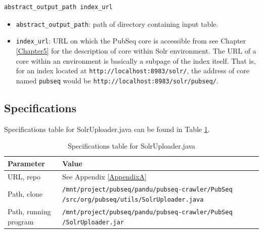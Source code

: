\begin{lstlisting}[breaklines]
abstract_output_path index_url
\end{lstlisting}

\begin{itemize}
\item \texttt{abstract\_output\_path}: path of directory containing input table.
\item \texttt{index\_url}: URL on which the PubSeq core is accessible from see Chapter \ref{Chapter5} for the description of core within Solr environment. The URL of a core within an environment is basically a subpage of the index itself. That is, for an index located at \texttt{http://localhost:8983/solr/}, the address of core named \texttt{pubseq} would be \texttt{http://localhost:8983/solr/pubseq/}.
\end{itemize}

\subsection{Specifications}

Specifications table for SolrUploader.java can be found in Table \ref{tab:SolrUploader}.

\begin{table}[htbp]
\caption{Specifications table for SolrUploader.java}
\centering
\begin{tabularx}{\textwidth}{ | l | X | }
  \hline
  Parameter & Value \\
  \hline
  URL, repo & See Appendix \ref{AppendixA} \\
  Path, clone & \texttt{/mnt/project/pubseq/pandu/pubseq-crawler/PubSeq /src/org/pubseq/utils/SolrUploader.java} \\
  Path, running program & \texttt{/mnt/project/pubseq/pandu/pubseq-crawler/PubSeq /SolrUploader.jar}\\
  \hline
\end{tabularx}
\label{tab:SolrUploader}
\end{table}
